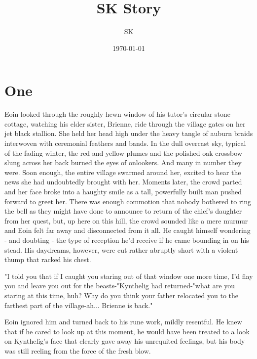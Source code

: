 \documentclass[twoside]{article}
\title{SK Story}
\author{SK}
\date{\today}
\begin{document}

\section{One}

Eoin looked through the roughly hewn window of his tutor's circular stone cottage, watching his elder sister, Brienne, ride through the village gates on her jet black stallion. She held her head high under the heavy tangle of auburn braids interwoven with ceremonial feathers and bands. In the dull overcast sky, typical of the fading winter, the red and yellow plumes and the polished oak crossbow slung across her back burned the eyes of onlookers. And many in number they were. Soon enough, the entire village swarmed around her, excited to hear the news she had undoubtedly brought with her. Moments later, the crowd parted and her face broke into a haughty smile as a tall, powerfully built man pushed forward to greet her. There was enough commotion that nobody bothered to ring the bell as they might have done to announce to return of the chief's daughter from her quest, but, up here on this hill, the crowd sounded like a mere murmur and Eoin felt far away and disconnected from it all. He caught himself wondering  - and doubting - the type of reception he'd receive if he came bounding in on his stead. His daydreams, however, were cut rather abruptly short with a violent thump that racked his chest.

"I told you that if I caught you staring out of that window one more time, I'd flay you and leave you out for the beasts-"Kynthelig had returned-"what are you staring at this time, huh? Why do you think your father relocated you to the farthest part of the village-ah... Brienne is back."

Eoin ignored him and turned back to his rune work, mildly resentful. He knew that if he cared to look up at this moment, he would have been treated to a look on Kynthelig's face that clearly gave away his unrequited feelings, but his body was still reeling from the force of the fresh blow.
\end{document}
